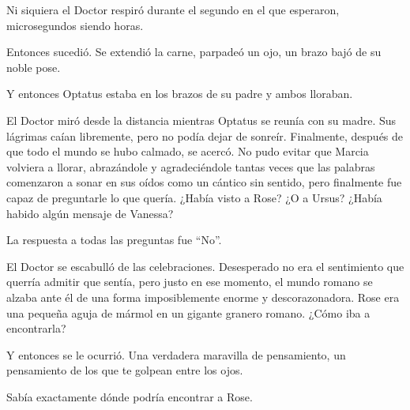 Ni siquiera el Doctor respiró durante el segundo en el que esperaron,
microsegundos siendo horas.

Entonces sucedió. Se extendió la carne, parpadeó un ojo, un brazo bajó
de su noble pose.

Y entonces Optatus estaba en los brazos de su padre y ambos lloraban.

El Doctor miró desde la distancia mientras Optatus se reunía con su
madre. Sus lágrimas caían libremente, pero no podía dejar de sonreír.
Finalmente, después de que todo el mundo se hubo calmado, se acercó. No
pudo evitar que Marcia volviera a llorar, abrazándole y agradeciéndole
tantas veces que las palabras comenzaron a sonar en sus oídos como un
cántico sin sentido, pero finalmente fue capaz de preguntarle lo que
quería. ¿Había visto a Rose? ¿O a Ursus? ¿Había habido algún mensaje de
Vanessa?

La respuesta a todas las preguntas fue ``No''.

El Doctor se escabulló de las celebraciones. Desesperado no era el
sentimiento que querría admitir que sentía, pero justo en ese momento,
el mundo romano se alzaba ante él de una forma imposiblemente enorme y
descorazonadora. Rose era una pequeña aguja de mármol en un gigante
granero romano. ¿Cómo iba a encontrarla?

Y entonces se le ocurrió. Una verdadera maravilla de pensamiento, un
pensamiento de los que te golpean entre los ojos.

Sabía exactamente dónde podría encontrar a Rose.
